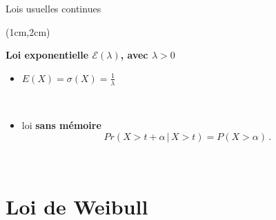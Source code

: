 \documentclass{beamer}
\begin{document}
\begin{frame}{Lois usuelles continues}
\begin{textblock*}{\textwidth}(1cm,2cm)

\begin{center}{\bf \Large Loi exponentielle $\mathcal{E}(\lambda)$, avec $\lambda>0$} \end{center}
\begin{itemize}
 \item $E(X)=\sigma(X)=\frac{1}{\lambda}$
 
 \
 
 \item loi {\large \bf sans mémoire}
$$
Pr(X>t+\alpha \,|\, X>t)=P(X>\alpha)\,.
$$
\end{itemize}

\



\end{textblock*}

\end{frame}


\section{Loi de Weibull}
\end{document}
